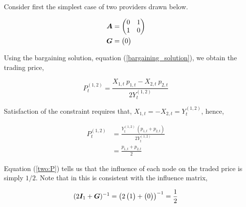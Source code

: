 Consider first the simplest case of two providers drawn below.

\vspace{5mm}
\begin{minipage}{.5\textwidth}
  \resizebox{\textwidth}{!}{}
\end{minipage}
\begin{minipage}{.45\textwidth}
  \begin{equation*}
    \begin{split}
      \bm{A} &= \begin{pmatrix}
        0 & 1 \\
        1 & 0
      \end{pmatrix} \\
      \bm{G} &= \begin{pmatrix}
        0
      \end{pmatrix}
    \end{split}
  \end{equation*}
\end{minipage}
\vspace{5mm}

Using the bargaining solution, equation (\ref{bargaining_solution}), we obtain the trading price,

\begin{equation}
  P^{(1, 2)}_t = \frac{X_{1, t} \  p_{1, t} - X_{2, t} \  p_{2, t}}{2 Y^{(1, 2)}_t}
\end{equation}

Satisfaction of the constraint requires that, $X_{1, t} = - X_{2, t} = Y^{(1, 2)}_t$, hence,

\begin{equation} \label{two:P}
  \begin{split}
    P^{(1, 2)}_t &= \frac{Y^{(1, 2)}_t \  \left( p_{1, t} + p_{2, t} \right)}{2  Y^{(1, 2)}_t} \\
    &= \frac{p_{1, t} + p_{2, t}}{2}
  \end{split}
\end{equation}

Equation (\ref{two:P}) tells us that the influence of each node on the traded price is simply $1 / 2$. Note that in this is consistent with the influence matrix,

\begin{equation}
  (2 \bm{I}_{1} + \bm{G})^{-1} = \left( 2 \begin{pmatrix} 1 \end{pmatrix} + \begin{pmatrix} 0 \end{pmatrix} \right)^{-1} = \frac{1}{2}
\end{equation}

